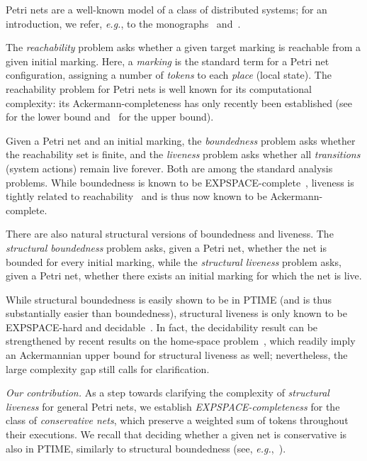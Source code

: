 \documentclass[11pt,a4paper]{amsart}
\def\eg{{\em e.g.}}
\theoremstyle{plain}
\theoremstyle{definition}
\theoremstyle{defC}
\theoremstyle{thmC}
\begin{document}
Petri nets are a well-known model of a class of distributed systems;
for an introduction, we refer, \eg, to the monographs~\cite{reisig2013} and~\cite{BestDevillers2024}.

The \emph{reachability} problem asks whether a given target marking is reachable from a given initial marking. Here, a \emph{marking} is the standard term for a Petri net configuration, assigning a number of \emph{tokens} to each \emph{place} (local state). The reachability problem for Petri nets is well known for its computational complexity: its Ackermann-completeness has only recently been established (see~\cite{DBLP:conf/focs/Leroux21,DBLP:conf/focs/CzerwinskiO21} for the lower bound and~\cite{DBLP:conf/lics/LerouxS19} for the upper bound).

Given a Petri net and an initial marking, the \emph{boundedness} problem asks whether the reachability set is finite, and the \emph{liveness} problem asks whether all \emph{transitions} (system actions) remain live forever. Both are among the standard analysis problems. While boundedness is known to be EXPSPACE-complete~\cite{DBLP:conf/stoc/CardozaLM76,DBLP:journals/tcs/Rackoff78}, liveness is tightly related to reachability~\cite{DBLP:conf/focs/Hack74} and is thus now known to be Ackermann-complete.


There are also natural structural versions of boundedness and liveness.
The \emph{structural boundedness} problem asks, given a Petri net, whether the net is bounded for every initial marking, while the \emph{structural liveness} problem asks, given a Petri net, whether there exists an initial marking for which the net is live.

While structural boundedness is easily shown to be in PTIME (and is thus substantially easier than boundedness), structural liveness is only known to be EXPSPACE-hard and decidable~\cite{DBLP:journals/acta/JancarP19}. In fact, the decidability result can be strengthened by recent results on the home-space problem~\cite{DBLP:conf/concur/JancarL23,DBLP:journals/lmcs/JancarL24}, which readily imply an Ackermannian upper bound for structural liveness as well; nevertheless, the large complexity gap still calls for clarification.


\emph{Our contribution.}
As a step towards clarifying the complexity of \emph{structural
liveness} for general Petri nets, we establish
\emph{EXPSPACE-completeness} for the class of \emph{conservative
nets}, which preserve a weighted sum of tokens throughout their
executions. We recall that deciding whether a given net is
conservative is also in PTIME, similarly to structural boundedness
(see, \eg,~\cite{DBLP:conf/apn/MayrW14}).
\end{document}

